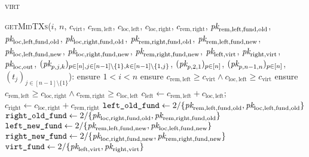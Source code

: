 \begin{center}
  \begin{processbox}{\textsc{virt}}
    \begin{algorithmic}[1]
      \State \textsc{getMidTXs}($i$, $n$, $c_{\mathrm{virt}}$, $c_{\mathrm{rem},
      \mathrm{left}}$, $c_{\mathrm{loc}, \mathrm{left}}$, $c_{\mathrm{loc},
      \mathrm{right}}$, $c_{\mathrm{rem}, \mathrm{right}}$, $\textit{pk}_{\mathrm{rem},
      \mathrm{left}, \mathrm{fund}, \mathrm{old}}$, $\textit{pk}_{\mathrm{loc},
      \mathrm{left}, \mathrm{fund}, \mathrm{old}}$, $\textit{pk}_{\mathrm{loc},
      \mathrm{right}, \mathrm{fund}, \mathrm{old}}$, $\textit{pk}_{\mathrm{rem},
      \mathrm{right}, \mathrm{fund}, \mathrm{old}}$, $\textit{pk}_{\mathrm{rem},
      \mathrm{left}, \mathrm{fund}, \mathrm{new}}$, $\textit{pk}_{\mathrm{loc},
      \mathrm{left}, \mathrm{fund}, \mathrm{new}}$, $\textit{pk}_{\mathrm{loc},
      \mathrm{right}, \mathrm{fund}, \mathrm{new}}$, $\textit{pk}_{\mathrm{rem},
      \mathrm{right}, \mathrm{fund}, \mathrm{new}}$, $\textit{pk}_{\mathrm{left},
      \mathrm{virt}}$, $\textit{pk}_{\mathrm{right}, \mathrm{virt}}$, $\textit{pk}_{\mathrm{loc},
      \mathrm{out}}$, $(\textit{pk}_{p,j,k})_{p \in [n], j \in [n-1] \setminus \{1\}, k
      \in [n-1] \setminus \{1, j\}}$, $(\textit{pk}_{p, 2, 1})_{p \in [n]}$, $(\textit{pk}_{p,
      n-1, n})_{p \in [n]}$, $(t_j)_{j \in [n-1] \setminus \{1\}}$):
      \Indent
        \State ensure $1 < i < n$
        \State ensure $c_{\mathrm{rem}, \mathrm{left}} \geq c_{\mathrm{virt}}
        \wedge c_{\mathrm{loc}, \mathrm{left}} \geq c_{\mathrm{virt}}$
        \State ensure $c_{\mathrm{rem}, \mathrm{left}} \geq c_{\mathrm{loc},
        \mathrm{right}} \wedge c_{\mathrm{rem}, \mathrm{right}} \geq
        c_{\mathrm{loc}, \mathrm{left}}$ 
        \State $c_{\mathrm{left}} \gets c_{\mathrm{rem}, \mathrm{left}} +
        c_{\mathrm{loc}, \mathrm{left}}$; $c_{\mathrm{right}} \gets
        c_{\mathrm{loc}, \mathrm{right}} + c_{\mathrm{rem}, \mathrm{right}}$
        \State $\texttt{left\_old\_fund} \gets 2/\{\textit{pk}_{\mathrm{rem},
        \mathrm{left}, \mathrm{fund}, \mathrm{old}}, \textit{pk}_{\mathrm{loc},
        \mathrm{left}, \mathrm{fund}, \mathrm{old}}\}$
        \State $\texttt{right\_old\_fund} \gets 2/\{\textit{pk}_{\mathrm{loc},
        \mathrm{right}, \mathrm{fund}, \mathrm{old}}, \textit{pk}_{\mathrm{rem},
        \mathrm{right}, \mathrm{fund}, \mathrm{old}}\}$
        \State $\texttt{left\_new\_fund} \gets 2/\{\textit{pk}_{\mathrm{rem},
        \mathrm{left}, \mathrm{fund}, \mathrm{new}}, \textit{pk}_{\mathrm{loc},
        \mathrm{left}, \mathrm{fund}, \mathrm{new}}\}$
        \State $\texttt{right\_new\_fund} \gets 2/\{\textit{pk}_{\mathrm{loc},
        \mathrm{right}, \mathrm{fund}, \mathrm{new}}, \textit{pk}_{\mathrm{rem},
        \mathrm{right}, \mathrm{fund}, \mathrm{new}}\}$
        \State $\texttt{virt\_fund} \gets 2/\{\textit{pk}_{\mathrm{left}, \mathrm{virt}},
        \textit{pk}_{\mathrm{right}, \mathrm{virt}}\}$


\end{algorithmic}
\end{processbox}
\end{center}
